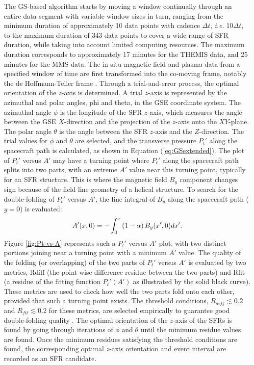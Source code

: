 The GS-based algorithm starts by moving a window continually through an entire data segment with variable window sizes in turn, ranging from the minimum duration of approximately 10 data points with cadence $\Delta t$, \textit{i.e.} 10$\Delta t$, to the maximum duration of 343 data points to cover a wide range of SFR duration, while taking into account limited computing resources. The maximum duration corresponds to approximately 17 minutes for the THEMIS data, and 25 minutes for the MMS data. The in situ magnetic field and plasma data from a specified window of time are first transformed into the co-moving frame, notably the de Hoffmann-Teller frame \citep{deHoffman-Teller:1950}. Through a trial-and-error process, the optimal orientation of the $z$-axis is determined. A trial $z$-axis is represented by the azimuthal and polar angles, \gls{phi} and \gls{theta}, in the GSE coordinate system. The azimuthal angle $\phi$ is the longitude of the SFR $z$-axis, which measures the angle between the GSE $X$-direction and the projection of the $z$-axis onto the $XY$-plane. The polar angle $\theta$ is the angle between the SFR $z$-axis and the $Z$-direction. The trial values for $\phi$ and $\theta$ are selected, and the transverse pressure $P_t'$ along the spacecraft path is calculated, as shown in Equation (\ref{eq:GSextended}). The plot of $P_t'$ versus $A'$ may have a turning point where $P_t'$ along the spacecraft path splits into two parts, with an extreme $A'$ value near this turning point, typically for an SFR structure. This is where the magnetic field $B_y$ component changes sign because of the field line geometry of a helical structure. To search for the double-folding of $P_t'$ versus $A'$, the line integral of $B_y$ along the spacecraft path ($y=0$) is evaluated:
\begin{equation}
    A'(x,0)=-\int_0^x\left( 1-\alpha \right)B_y(x',0)dx'.
    \label{eq:By-integral}
\end{equation}
Figure \ref{fig:Pt-vs-A} represents such a $P_t'$ versus $A'$ plot, with two distinct portions joining near a turning point with a minimum $A'$ value. The quality of the folding (or overlapping) of the two parts of $P_t'$ versus $A'$ is evaluated by two metrics, \gls{Rdiff} (the point-wise difference residue between the two parts) and \gls{Rfit} (a residue of the fitting function $P_t'(A')$ as illustrated by the solid black curve). These metrics are used to check how well the two parts fold onto each other, provided that such a turning point exists. The threshold conditions, $R_{diff}\lesssim 0.2$ and $R_{fit}\lesssim 0.2$ for these metrics, are selected empirically to guarantee good double-folding quality \citep{Hu:2018}. The optimal orientation of the $z$-axis of the SFRs is found by going through iterations of $\phi$ and $\theta$ until the minimum residue values are found. Once the minimum residues satisfying the threshold conditions are found, the corresponding optimal $z$-axis orientation and event interval are recorded as an SFR candidate.

